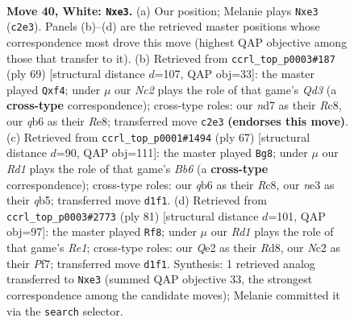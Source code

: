 \documentclass[11pt]{article}
\begin{document}
\clearpage

\begin{figure}[p]\centering
\begin{subfigure}{0.46\textwidth}\centering
\resizebox{\linewidth}{!}{%
\newchessgame
\chessboard[
  setfen={r4rk1/3n4/1q1p4/1P2bp1p/p1p4P/P3n1P1/R1N1Q3/1N1R2K1 w - - 0 40},
  showmover=false,
  pgfstyle=straightmove, color=movearrow, markmove={c2-e3}
]}
\caption{}
\end{subfigure}\hfill
\begin{subfigure}{0.46\textwidth}\centering
\resizebox{\linewidth}{!}{%
\newchessgame
\chessboard[
  setfen={2r1r3/pp4k1/3qPpp1/2n4p/2P2P2/2Q2N1P/6P1/3RR1K1 b - - 0 35},
  showmover=false,
  pgfstyle=straightmove, color=movearrow, markmove={d6-f4}
]}
\caption{}
\end{subfigure}
\\[4pt]
\begin{subfigure}{0.46\textwidth}\centering
\resizebox{\linewidth}{!}{%
\newchessgame
\chessboard[
  setfen={2r1r2k/p1P3p1/6p1/1Q2n2p/3p1q1P/1b3N2/4PPB1/R1R3K1 b - - 2 34},
  showmover=false,
  pgfstyle=straightmove, color=movearrow, markmove={b3-g8}
]}
\caption{}
\end{subfigure}\hfill
\begin{subfigure}{0.46\textwidth}\centering
\resizebox{\linewidth}{!}{%
\newchessgame
\chessboard[
  setfen={3rr1k1/5ppn/3N3q/p1p1P2P/P1Np1n2/5Q2/1P1R4/4R2K b - - 1 41},
  showmover=false,
  pgfstyle=straightmove, color=movearrow, markmove={e8-f8}
]}
\caption{}
\end{subfigure}
\caption{\textbf{Move 40, White: \texttt{Nxe3}.} (a) Our position; Melanie plays \texttt{Nxe3} (\texttt{c2e3}). Panels (b)--(d) are the retrieved master positions whose correspondence most drove this move (highest QAP objective among those that transfer to it). (b) Retrieved from \texttt{ccrl\_top\_p0003\#187} (ply 69) [structural distance $d$=107, QAP obj=33]: the master played \texttt{Qxf4}; under $\mu$ our \emph{Nc2} plays the role of that game's \emph{Qd3} (a \textbf{cross-type} correspondence); cross-type roles: our \emph{n}d7 as their \emph{R}c8, our \emph{q}b6 as their \emph{R}e8; transferred move \texttt{c2e3} \textbf{(endorses this move)}. (c) Retrieved from \texttt{ccrl\_top\_p0001\#1494} (ply 67) [structural distance $d$=90, QAP obj=111]: the master played \texttt{Bg8}; under $\mu$ our \emph{Rd1} plays the role of that game's \emph{Bb6} (a \textbf{cross-type} correspondence); cross-type roles: our \emph{q}b6 as their \emph{R}c8, our \emph{n}e3 as their \emph{q}b5; transferred move \texttt{d1f1}. (d) Retrieved from \texttt{ccrl\_top\_p0003\#2773} (ply 81) [structural distance $d$=101, QAP obj=97]: the master played \texttt{Rf8}; under $\mu$ our \emph{Rd1} plays the role of that game's \emph{Re1}; cross-type roles: our \emph{Q}e2 as their \emph{R}d8, our \emph{N}c2 as their \emph{P}f7; transferred move \texttt{d1f1}. Synthesis: 1 retrieved analog transferred to \texttt{Nxe3} (summed QAP objective 33, the strongest correspondence among the candidate moves); Melanie committed it via the \texttt{search} selector.}
\label{fig:thought-m78}
\end{figure}
\end{document}
